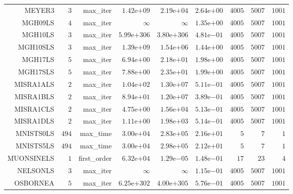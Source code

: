 \begin{longtable}{rrrrrrrrr}
MEYER3 & \(     3\) & max\_iter & \( 1.42\)e\(+09\) & \( 2.19\)e\(+04\) & \( 2.64\)e\(+00\) & \(  4005\) & \(  5007\) & \(  1001\) \\
MGH09LS & \(     4\) & max\_iter & \(\infty\) & \(\infty\) & \( 1.35\)e\(+00\) & \(  4005\) & \(  5007\) & \(  1001\) \\
MGH10LS & \(     3\) & max\_iter & \(5.99\)e\(+306\) & \(3.80\)e\(+306\) & \( 4.81\)e\(-01\) & \(  4005\) & \(  5007\) & \(  1001\) \\
MGH10SLS & \(     3\) & max\_iter & \( 1.39\)e\(+09\) & \( 1.54\)e\(+06\) & \( 1.44\)e\(+00\) & \(  4005\) & \(  5007\) & \(  1001\) \\
MGH17LS & \(     5\) & max\_iter & \( 6.94\)e\(+00\) & \( 2.18\)e\(+01\) & \( 1.98\)e\(+00\) & \(  4005\) & \(  5007\) & \(  1001\) \\
MGH17SLS & \(     5\) & max\_iter & \( 7.88\)e\(+00\) & \( 2.35\)e\(+01\) & \( 1.99\)e\(+00\) & \(  4005\) & \(  5007\) & \(  1001\) \\
MISRA1ALS & \(     2\) & max\_iter & \( 1.04\)e\(+02\) & \( 1.30\)e\(+07\) & \( 5.11\)e\(-01\) & \(  4005\) & \(  5007\) & \(  1001\) \\
MISRA1BLS & \(     2\) & max\_iter & \( 8.94\)e\(+01\) & \( 1.20\)e\(+07\) & \( 3.89\)e\(-01\) & \(  4005\) & \(  5007\) & \(  1001\) \\
MISRA1CLS & \(     2\) & max\_iter & \( 4.75\)e\(+00\) & \( 1.56\)e\(+04\) & \( 5.13\)e\(-01\) & \(  4005\) & \(  5007\) & \(  1001\) \\
MISRA1DLS & \(     2\) & max\_iter & \( 1.11\)e\(+00\) & \( 1.98\)e\(+03\) & \( 5.14\)e\(-01\) & \(  4005\) & \(  5007\) & \(  1001\) \\
MNISTS0LS & \(   494\) & max\_time & \( 3.00\)e\(+04\) & \( 2.83\)e\(+05\) & \( 2.16\)e\(+01\) & \(     5\) & \(     7\) & \(     1\) \\
MNISTS5LS & \(   494\) & max\_time & \( 3.00\)e\(+04\) & \( 2.98\)e\(+05\) & \( 2.12\)e\(+01\) & \(     5\) & \(     7\) & \(     1\) \\
MUONSINELS & \(     1\) & first\_order & \( 6.32\)e\(+04\) & \( 1.29\)e\(-05\) & \( 1.48\)e\(-01\) & \(    17\) & \(    23\) & \(     4\) \\
NELSONLS & \(     3\) & max\_iter & \(\infty\) & \(\infty\) & \( 1.15\)e\(-01\) & \(  4005\) & \(  5007\) & \(  1001\) \\
OSBORNEA & \(     5\) & max\_iter & \(6.25\)e\(+302\) & \(4.00\)e\(+305\) & \( 5.76\)e\(-01\) & \(  4005\) & \(  5007\) & \(  1001\) \\

\end{longtable}
